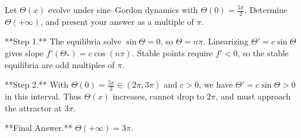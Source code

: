 Let $\Theta(x)$ evolve under sine–Gordon dynamics with $\Theta(0)=\tfrac{5\pi}{2}$. Determine $\Theta(+\infty)$, and present your answer as a multiple of $\pi$.

**Step 1.** The equilibria solve $\sin \Theta = 0$, so $\Theta = n\pi$. Linearizing $\Theta' = c \sin \Theta$ gives slope $f'(\Theta_*) = c \cos(n\pi)$. Stable points require $f' < 0$, so the stable equilibria are odd multiples of $\pi$.

**Step 2.** With $\Theta(0) = \frac{5\pi}{2} \in (2\pi, 3\pi)$ and $c > 0$, we have $\Theta' = c \sin \Theta > 0$ in this interval. Thus $\Theta(x)$ increases, cannot drop to $2\pi$, and must approach the attractor at $3\pi$.

**Final Answer.** $\Theta(+\infty) = 3\pi$.